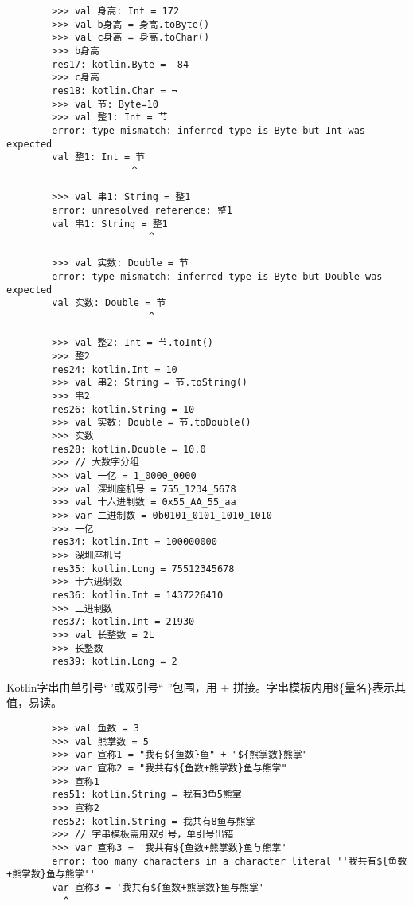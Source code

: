     \begin{verbatim}
        >>> val 身高: Int = 172
        >>> val b身高 = 身高.toByte()
        >>> val c身高 = 身高.toChar()
        >>> b身高
        res17: kotlin.Byte = -84
        >>> c身高
        res18: kotlin.Char = ¬
        >>> val 节: Byte=10
        >>> val 整1: Int = 节
        error: type mismatch: inferred type is Byte but Int was expected
        val 整1: Int = 节
                      ^
        
        >>> val 串1: String = 整1
        error: unresolved reference: 整1
        val 串1: String = 整1
                         ^
        
        >>> val 实数: Double = 节
        error: type mismatch: inferred type is Byte but Double was expected
        val 实数: Double = 节
                         ^
        
        >>> val 整2: Int = 节.toInt()
        >>> 整2
        res24: kotlin.Int = 10
        >>> val 串2: String = 节.toString()
        >>> 串2
        res26: kotlin.String = 10
        >>> val 实数: Double = 节.toDouble()
        >>> 实数
        res28: kotlin.Double = 10.0
        >>> // 大数字分组
        >>> val 一亿 = 1_0000_0000
        >>> val 深圳座机号 = 755_1234_5678
        >>> val 十六进制数 = 0x55_AA_55_aa
        >>> var 二进制数 = 0b0101_0101_1010_1010
        >>> 一亿
        res34: kotlin.Int = 100000000
        >>> 深圳座机号
        res35: kotlin.Long = 75512345678
        >>> 十六进制数
        res36: kotlin.Int = 1437226410
        >>> 二进制数
        res37: kotlin.Int = 21930
        >>> val 长整数 = 2L
        >>> 长整数
        res39: kotlin.Long = 2                
    \end{verbatim}

Kotlin字串由单引号‘ ’或双引号“ ”包围，用 + 拼接。字串模板内用\$\{量名\}表示其值，易读。

    \begin{verbatim}
        >>> val 鱼数 = 3
        >>> val 熊掌数 = 5
        >>> var 宣称1 = "我有${鱼数}鱼" + "${熊掌数}熊掌"
        >>> var 宣称2 = "我共有${鱼数+熊掌数}鱼与熊掌"
        >>> 宣称1
        res51: kotlin.String = 我有3鱼5熊掌
        >>> 宣称2
        res52: kotlin.String = 我共有8鱼与熊掌
        >>> // 字串模板需用双引号，单引号出错
        >>> var 宣称3 = '我共有${鱼数+熊掌数}鱼与熊掌'
        error: too many characters in a character literal ''我共有${鱼数+熊掌数}鱼与熊掌''
        var 宣称3 = '我共有${鱼数+熊掌数}鱼与熊掌'
          ^
            
    \end{verbatim}

